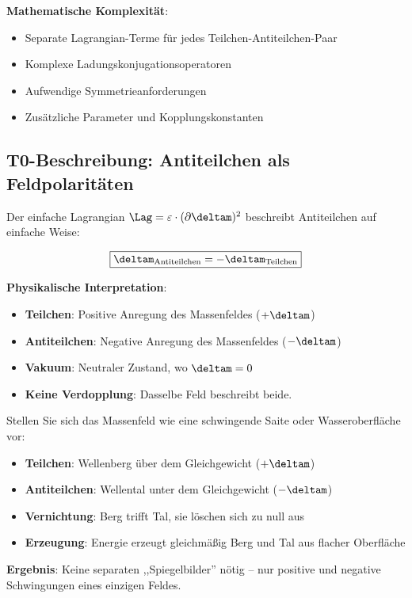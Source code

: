 	\textbf{Mathematische Komplexität}:
	\begin{itemize}
		\item Separate Lagrangian-Terme für jedes Teilchen-Antiteilchen-Paar
		\item Komplexe Ladungskonjugationsoperatoren
		\item Aufwendige Symmetrieanforderungen
		\item Zusätzliche Parameter und Kopplungskonstanten
	\end{itemize}
	
	\subsection{T0-Beschreibung: Antiteilchen als Feldpolaritäten}
	
	Der einfache Lagrangian $\Lag = \varepsilon \cdot (\partial \deltam)^2$ beschreibt Antiteilchen auf einfache Weise:
	
	\begin{equation}
		\boxed{\deltam_{\text{Antiteilchen}} = -\deltam_{\text{Teilchen}}}
		\label{eq:antiparticle_solution}
	\end{equation}
	
	\textbf{Physikalische Interpretation}:
	\begin{itemize}
		\item \textbf{Teilchen}: Positive Anregung des Massenfeldes ($+\deltam$)
		\item \textbf{Antiteilchen}: Negative Anregung des Massenfeldes ($-\deltam$)  
		\item \textbf{Vakuum}: Neutraler Zustand, wo $\deltam = 0$
		\item \textbf{Keine Verdopplung}: Dasselbe Feld beschreibt beide.
	\end{itemize}
	
	\begin{tcolorbox}[colback=green!5!white,colframe=green!75!black,title=Anschauliches Antiteilchen-Bild]
		Stellen Sie sich das Massenfeld wie eine schwingende Saite oder Wasseroberfläche vor:
		\begin{itemize}
			\item \textbf{Teilchen}: Wellenberg über dem Gleichgewicht ($+\deltam$)
			\item \textbf{Antiteilchen}: Wellental unter dem Gleichgewicht ($-\deltam$)
			\item \textbf{Vernichtung}: Berg trifft Tal, sie löschen sich zu null aus
			\item \textbf{Erzeugung}: Energie erzeugt gleichmäßig Berg und Tal aus flacher Oberfläche
		\end{itemize}
		
		\textbf{Ergebnis}: Keine separaten ,,Spiegelbilder'' nötig -- nur positive und negative Schwingungen eines einzigen Feldes.
	\end{tcolorbox}
	
